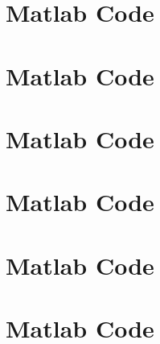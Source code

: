 \documentclass[a4paper,12pt]{article}
\begin{document}
\newpage
\section*{Matlab Code} 
\newpage
\section*{Matlab Code} 
\newpage
\section*{Matlab Code} 
\newpage
\section*{Matlab Code} 
\newpage
\section*{Matlab Code} 
\newpage
\section*{Matlab Code} 
\end{document}
